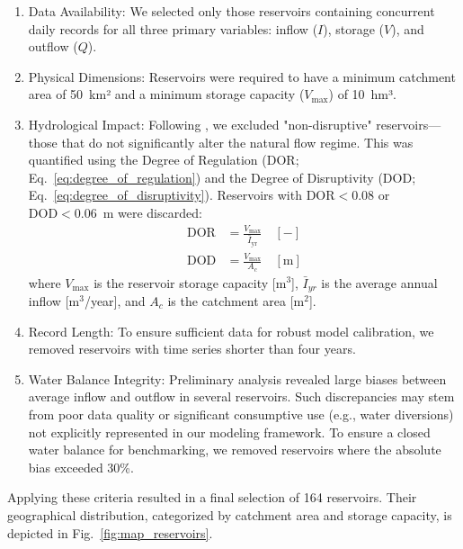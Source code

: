 \documentclass[hess, manuscript]{copernicus}
\begin{document}
\begin{enumerate}
    \item Data Availability: We selected only those reservoirs containing concurrent daily records for all three primary variables: inflow ($I$), storage ($V$), and outflow ($Q$).
    \item Physical Dimensions: Reservoirs were required to have a minimum catchment area of 50~km² and a minimum storage capacity ($V_{\max}$) of 10~hm³.
    \item Hydrological Impact: Following \citet{Shrestha2024}, we excluded "non-disruptive" reservoirs—those that do not significantly alter the natural flow regime. This was quantified using the Degree of Regulation ($\text{DOR}$; Eq.~\ref{eq:degree_of_regulation}) and the Degree of Disruptivity ($\text{DOD}$; Eq.~\ref{eq:degree_of_disruptivity}). Reservoirs with $\text{DOR} < 0.08$ or $\text{DOD} < 0.06$~m were discarded:
    \begin{subequations}
        \label{eq:disruptive_reservoirs}
        \begin{align}
            \text{DOR} &= \frac{V_{\max}}{\bar{I}_{\text{yr}}} \quad [-] \label{eq:degree_of_regulation} \\[1ex]
            \text{DOD} &= \frac{V_{\max}}{A_c} \quad [\text{m}] \label{eq:degree_of_disruptivity}
        \end{align} 
    \end{subequations}
    where $V_{\max}$ is the reservoir storage capacity [m$^3$], $\bar{I}_{yr}$ is the average annual inflow [m$^3$/year], and $A_c$ is the catchment area [m$^2$].
    \item Record Length: To ensure sufficient data for robust model calibration, we removed reservoirs with time series shorter than four years.
    \item Water Balance Integrity: Preliminary analysis revealed large biases between average inflow and outflow in several reservoirs. Such discrepancies may stem from poor data quality or significant consumptive use (e.g., water diversions) not explicitly represented in our modeling framework. To ensure a closed water balance for benchmarking, we removed reservoirs where the absolute bias exceeded 30\%.
\end{enumerate}

Applying these criteria resulted in a final selection of 164 reservoirs. Their geographical distribution, categorized by catchment area and storage capacity, is depicted in Fig.~\ref{fig:map_reservoirs}.
\end{document}

